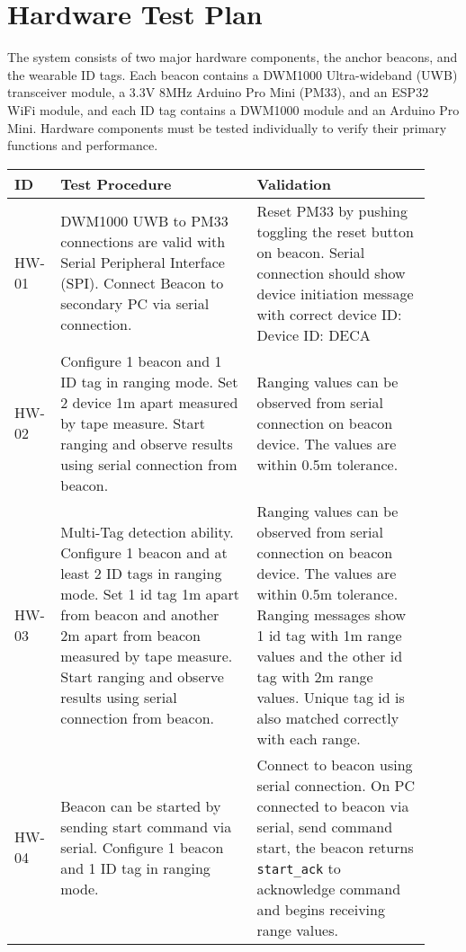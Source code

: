 

\setcounter{section}{2}
\section{Hardware Test Plan}
\bigskip

The system consists of two major hardware components, the anchor beacons, and the wearable ID tags. Each beacon contains a DWM1000 Ultra-wideband (UWB) transceiver module, a 3.3V 8MHz Arduino Pro Mini (PM33), and an ESP32 WiFi module, and each ID tag contains a DWM1000 module and an Arduino Pro Mini. Hardware components must be tested individually to verify their primary functions and performance.


\bigskip
\bgroup
\def\arraystretch{1.3}
\begin{table}[h!]
    \centering
    \begin{tabular}{|p{0.07\linewidth}|p{0.45\linewidth}|p{0.40\linewidth}|}  
    \hline
    ID & Test Procedure & Validation\\ 

    \hline
    HW-01
	& DWM1000 UWB to PM33 connections are valid with Serial Peripheral Interface (SPI). Connect Beacon to secondary PC via serial connection.
	& Reset PM33 by pushing toggling the reset button on beacon. Serial connection should show device initiation message with correct device ID: Device ID: DECA\\
     
    \hline  
    HW-02
	& Configure 1 beacon and 1 ID tag in ranging mode. Set 2 device 1m apart measured by tape measure. Start ranging and observe results using serial connection from beacon.
	& Ranging values can be observed from serial connection on beacon device. The values are within 0.5m tolerance.\\

	\hline  
	HW-03
	& Multi-Tag detection ability. Configure 1 beacon and at least 2 ID tags in ranging mode. Set 1 id tag 1m apart from beacon and another 2m apart from beacon measured by tape measure. Start ranging and observe results using serial connection from beacon.
	& Ranging values can be observed from serial connection on beacon device. The values are within 0.5m tolerance. Ranging messages show 1 id tag with 1m range values and the other id tag with 2m range values. Unique tag id is also matched correctly with each range. \\
	
	\hline  
	HW-04
	& Beacon can be started by sending start command via serial. Configure 1 beacon and 1 ID tag in ranging mode.
	& Connect to beacon using serial connection.
	On PC connected to beacon via serial, send command start, the beacon returns \texttt{start\_ack} to acknowledge command and begins receiving range values.\\
	

\end{tabular}
\end{table}
